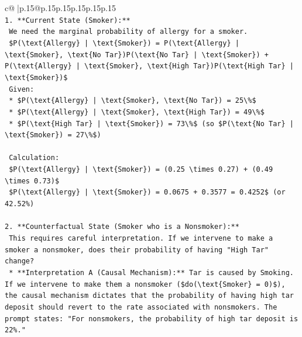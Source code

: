 \documentclass{article}
\begin{document}
{\begin{supertabular}{c@{$\;$}|p{.15\linewidth}@{}p{.15\linewidth}p{.15\linewidth}p{.15\linewidth}p{.15\linewidth}p{.15\linewidth}}
{{{\\ 
\texttt{1.  **Current State (Smoker):**} \\
\texttt{    We need the marginal probability of allergy for a smoker.} \\
\texttt{    \$P(\textbackslash{}text\{Allergy\} | \textbackslash{}text\{Smoker\}) = P(\textbackslash{}text\{Allergy\} | \textbackslash{}text\{Smoker\}, \textbackslash{}text\{No Tar\})P(\textbackslash{}text\{No Tar\} | \textbackslash{}text\{Smoker\}) + P(\textbackslash{}text\{Allergy\} | \textbackslash{}text\{Smoker\}, \textbackslash{}text\{High Tar\})P(\textbackslash{}text\{High Tar\} | \textbackslash{}text\{Smoker\})\$} \\
\texttt{    Given:} \\
\texttt{    *   \$P(\textbackslash{}text\{Allergy\} | \textbackslash{}text\{Smoker\}, \textbackslash{}text\{No Tar\}) = 25\textbackslash{}\%\$} \\
\texttt{    *   \$P(\textbackslash{}text\{Allergy\} | \textbackslash{}text\{Smoker\}, \textbackslash{}text\{High Tar\}) = 49\textbackslash{}\%\$} \\
\texttt{    *   \$P(\textbackslash{}text\{High Tar\} | \textbackslash{}text\{Smoker\}) = 73\textbackslash{}\%\$ (so \$P(\textbackslash{}text\{No Tar\} | \textbackslash{}text\{Smoker\}) = 27\textbackslash{}\%\$)} \\
\\ 
\texttt{    Calculation:} \\
\texttt{    \$P(\textbackslash{}text\{Allergy\} | \textbackslash{}text\{Smoker\}) = (0.25 \textbackslash{}times 0.27) + (0.49 \textbackslash{}times 0.73)\$} \\
\texttt{    \$P(\textbackslash{}text\{Allergy\} | \textbackslash{}text\{Smoker\}) = 0.0675 + 0.3577 = 0.4252\$ (or 42.52\%)} \\
\\ 
\texttt{2.  **Counterfactual State (Smoker who is a Nonsmoker):**} \\
\texttt{    This requires careful interpretation. If we intervene to make a smoker a nonsmoker, does their probability of having "High Tar" change?} \\
\texttt{    *   **Interpretation A (Causal Mechanism):** Tar is caused by Smoking. If we intervene to make them a nonsmoker (\$do(\textbackslash{}text\{Smoker\} = 0)\$), the causal mechanism dictates that the probability of having high tar deposit should revert to the rate associated with nonsmokers. The prompt states: "For nonsmokers, the probability of high tar deposit is 22\%."} \\
}}}
\end{supertabular}}
\end{document}
